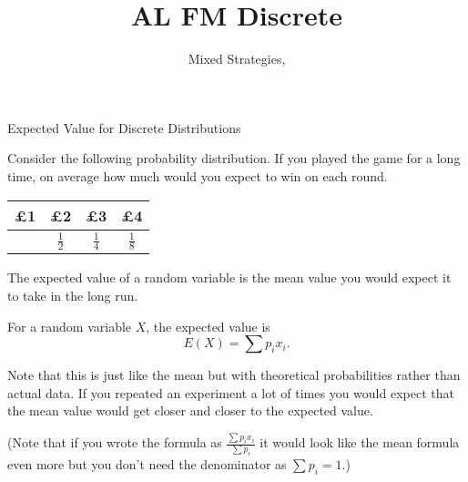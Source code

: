 \documentclass[8pt]{beamer}
\title[Discrete]{{\color{aa}\Huge\adfbullet{9}}AL FM Discrete}
\subtitle{Mixed Strategies, \textattachfile{MixedStrategies.tex}{(TeX)}}
\begin{document}
\setlength{\abovedisplayskip}{0pt}
\setlength{\belowdisplayskip}{0pt}
\setlength{\abovedisplayshortskip}{0pt}
\setlength{\belowdisplayshortskip}{0pt}

\frame{\titlepage}

\begin{frame}[shrink=5]{Expected Value for Discrete Distributions}
	\begin{problem}
		Consider the following probability distribution. If you played the game for a long time, on average how much would you expect to win on each round.
			\begin{center}
			\colorbox{cc}{
  \setlength\arrayrulewidth{0.5mm}
	\begin{tabular}{c|c|c|c}
		£1 & £2 & £3 & £4 \\ \hline
		\sol{$\frac{1}{8}$} & $\frac{1}{2}$ & $\frac{1}{4}$ & $\frac{1}{8}$ \\
\end{tabular}}
\end{center}
	\end{problem}


	The expected value of a random variable is the mean value you would expect it to take in the long run.

	\begin{definition}
		For a random variable $X$, the expected value is
		\[
			E(X) = \sum p_i x_i
		.\] 
	\end{definition}

	Note that this is just like the mean but with theoretical probabilities rather than actual data. If you repeated an experiment a lot of times you would expect that the mean value would get closer and closer to the expected value.

	(Note that if you wrote the formula as $\frac{\sum p_i x_i}{\sum p_i}$ it would look like the mean formula even more but you don't need the denominator as $\sum p_i =1$.)
\end{frame}
\end{document}
